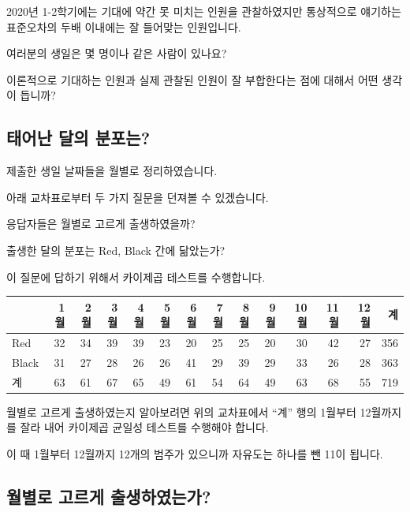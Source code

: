 \documentclass[
]{book}
\begin{document}
2020년 1-2학기에는 기대에 약간 못 미치는 인원을 관찰하였지만 통상적으로 얘기하는 표준오차의 두배 이내에는 잘 들어맞는 인원입니다.

여러분의 생일은 몇 명이나 같은 사람이 있나요?

이론적으로 기대하는 인원과 실제 관찰된 인원이 잘 부합한다는 점에 대해서 어떤 생각이 듭니까?

\subsection{태어난 달의 분포는?}\label{uxd0dcuxc5b4uxb09c-uxb2ecuxc758-uxbd84uxd3ecuxb294}

제출한 생일 날짜들을 월별로 정리하였습니다.

아래 교차표로부터 두 가지 질문을 던져볼 수 있겠습니다.

응답자들은 월별로 고르게 출생하였을까?

출생한 달의 분포는 Red, Black 간에 닮았는가?

이 질문에 답하기 위해서 카이제곱 테스트를 수행합니다.

\begin{tabular}{l|r|r|r|r|r|r|r|r|r|r|r|r|r}
\hline
  & 1월 & 2월 & 3월 & 4월 & 5월 & 6월 & 7월 & 8월 & 9월 & 10월 & 11월 & 12월 & 계\\
\hline
Red & 32 & 34 & 39 & 39 & 23 & 20 & 25 & 25 & 20 & 30 & 42 & 27 & 356\\
\hline
Black & 31 & 27 & 28 & 26 & 26 & 41 & 29 & 39 & 29 & 33 & 26 & 28 & 363\\
\hline
계 & 63 & 61 & 67 & 65 & 49 & 61 & 54 & 64 & 49 & 63 & 68 & 55 & 719\\
\hline
\end{tabular}

월별로 고르게 출생하였는지 알아보려면 위의 교차표에서 ``계'' 행의 1월부터 12월까지를 잘라 내어 카이제곱 균일성 테스트를 수행해야 합니다.

이 때 1월부터 12월까지 12개의 범주가 있으니까 자유도는 하나를 뺀 11이 됩니다.

\subsection{월별로 고르게 출생하였는가?}\label{uxc6d4uxbcc4uxb85c-uxace0uxb974uxac8c-uxcd9cuxc0dduxd558uxc600uxb294uxac00}
\end{document}

